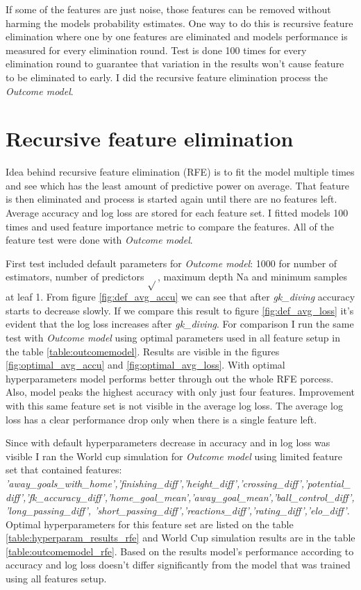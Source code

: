 If some of the features are just noise, those features can be removed without harming the models probability estimates. One way to do this is recursive feature elimination where one by one features are eliminated and models performance is measured for every  elimination round. Test is done 100 times for every elimination round to guarantee that variation in the results won't cause feature to be eliminated to early. I did the recursive feature elimination process the \textit{Outcome model}.

\section{Recursive feature elimination}
Idea behind recursive feature elimination (RFE) is to fit the model multiple times and see which has the least amount of predictive power on average. That feature is then eliminated and process is started again until there are no features left. Average accuracy and log loss are stored for each feature set. I fitted models 100 times and used feature importance metric to compare the features. All of the feature test were done with \textit{Outcome model}.

First test included default parameters for \textit{Outcome model}: 1000 for number of estimators, number of predictors $\sqrt{}$, maximum depth Na and minimum samples at leaf 1. From figure \ref{fig:def_avg_accu} we can see that after \textit{gk\_diving} accuracy starts to decrease slowly. If we compare this result to figure \ref{fig:def_avg_loss}
it's evident that the log loss increases after \textit{gk\_diving}. For comparison I run the same test with \textit{Outcome model} using optimal parameters used in all feature setup in the table \ref{table:outcomemodel}. Results are visible in the figures \ref{fig:optimal_avg_accu} and \ref{fig:optimal_avg_loss}. With optimal hyperparameters model performs better through out the whole RFE porcess. Also, model peaks the highest accuracy with only just four features. Improvement with this same feature set is not visible in the average log loss. The average log loss has a clear performance drop only when there is a single feature left.

Since with default hyperparameters decrease in accuracy and in log loss was visible I ran the World cup simulation for \textit{Outcome model} using limited feature set that contained features: \textit{'away\_goals\_with\_home','finishing\_diff','height\_diff','crossing\_diff','potential\_diff','fk\_accuracy\_diff','home\_goal\_mean','away\_goal\_mean','ball\_control\_diff','long\_passing\_diff', 'short\_passing\_diff','reactions\_diff','rating\_diff','elo\_diff'}. Optimal hyperparameters for this feature set are listed on the table \ref{table:hyperparam_results_rfe} and World Cup simulation results are in the table \ref{table:outcomemodel_rfe}. Based on the results model's performance according to accuracy and log loss doesn't differ significantly from the model that was trained using all features setup.

